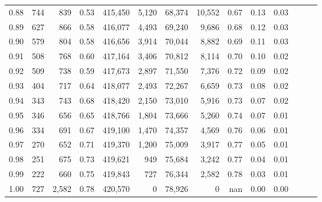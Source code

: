 \begin{tabular}{rrrrrrrrrrrrrr}
0.88 &     744 &    839 &  0.53 &  415,450 &    5,120 &  68,374 &  10,552 &  0.67 &  0.13 &      0.03 \\
0.89 &     627 &    866 &  0.58 &  416,077 &    4,493 &  69,240 &   9,686 &  0.68 &  0.12 &      0.03 \\
0.90 &     579 &    804 &  0.58 &  416,656 &    3,914 &  70,044 &   8,882 &  0.69 &  0.11 &      0.03 \\
0.91 &     508 &    768 &  0.60 &  417,164 &    3,406 &  70,812 &   8,114 &  0.70 &  0.10 &      0.02 \\
0.92 &     509 &    738 &  0.59 &  417,673 &    2,897 &  71,550 &   7,376 &  0.72 &  0.09 &      0.02 \\
0.93 &     404 &    717 &  0.64 &  418,077 &    2,493 &  72,267 &   6,659 &  0.73 &  0.08 &      0.02 \\
0.94 &     343 &    743 &  0.68 &  418,420 &    2,150 &  73,010 &   5,916 &  0.73 &  0.07 &      0.02 \\
0.95 &     346 &    656 &  0.65 &  418,766 &    1,804 &  73,666 &   5,260 &  0.74 &  0.07 &      0.01 \\
0.96 &     334 &    691 &  0.67 &  419,100 &    1,470 &  74,357 &   4,569 &  0.76 &  0.06 &      0.01 \\
0.97 &     270 &    652 &  0.71 &  419,370 &    1,200 &  75,009 &   3,917 &  0.77 &  0.05 &      0.01 \\
0.98 &     251 &    675 &  0.73 &  419,621 &      949 &  75,684 &   3,242 &  0.77 &  0.04 &      0.01 \\
0.99 &     222 &    660 &  0.75 &  419,843 &      727 &  76,344 &   2,582 &  0.78 &  0.03 &      0.01 \\
1.00 &     727 &  2,582 &  0.78 &  420,570 &        0 &  78,926 &       0 &   nan &  0.00 &      0.00 \\
\bottomrule
\end{tabular}
